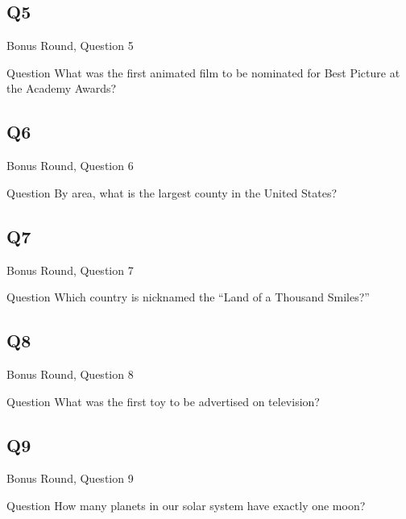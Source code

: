 \documentclass[11pt]{beamer}
\begin{document}
\subsection*{Q5}
\begin{frame}[t]{Bonus Round, Question 5}
\vspace{2em}
\begin{block}{Question}
What was the first animated film to be nominated for Best Picture at the Academy Awards\@?
\end{block}
\end{frame}
    

\subsection*{Q6}
\begin{frame}[t]{Bonus Round, Question 6}
\vspace{2em}
\begin{block}{Question}
By area, what is the largest county in the United States\@?
\end{block}
\end{frame}
    

\subsection*{Q7}
\begin{frame}[t]{Bonus Round, Question 7}
\vspace{2em}
\begin{block}{Question}
Which country is nicknamed the ``Land of a Thousand Smiles?''
\end{block}
\end{frame}
    

\subsection*{Q8}
\begin{frame}[t]{Bonus Round, Question 8}
\vspace{2em}
\begin{block}{Question}
What was the first toy to be advertised on television\@?
\end{block}
\end{frame}
    

\subsection*{Q9}
\begin{frame}[t]{Bonus Round, Question 9}
\vspace{2em}
\begin{block}{Question}
How many planets in our solar system have exactly one moon\@?
\end{block}
\end{frame}
    
\end{document}
